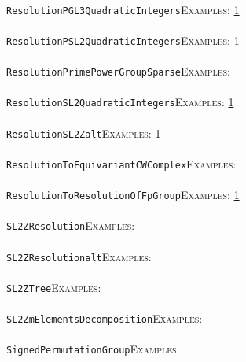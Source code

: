 \documentclass[a4paper,11pt]{report}
\begin{document}
{{ \\
 \texttt{ResolutionPGL3QuadraticIntegers}{\nobreakspace}{\nobreakspace}{\nobreakspace}{\nobreakspace}\textsc{Examples:} \href{tutorial/chap10.html} {1}{\nobreakspace} \\
 \\
 \texttt{ResolutionPSL2QuadraticIntegers}{\nobreakspace}{\nobreakspace}{\nobreakspace}{\nobreakspace}\textsc{Examples:} \href{tutorial/chap10.html} {1}{\nobreakspace} \\
 \\
 \texttt{ResolutionPrimePowerGroupSparse}{\nobreakspace}{\nobreakspace}{\nobreakspace}{\nobreakspace}\textsc{Examples:} \\
 \\
 \texttt{ResolutionSL2QuadraticIntegers}{\nobreakspace}{\nobreakspace}{\nobreakspace}{\nobreakspace}\textsc{Examples:} \href{tutorial/chap10.html} {1}{\nobreakspace} \\
 \\
 \texttt{ResolutionSL2Z{\textunderscore}alt}{\nobreakspace}{\nobreakspace}{\nobreakspace}{\nobreakspace}\textsc{Examples:} \href{tutorial/chap10.html} {1}{\nobreakspace} \\
 \\
 \texttt{ResolutionToEquivariantCWComplex}{\nobreakspace}{\nobreakspace}{\nobreakspace}{\nobreakspace}\textsc{Examples:} \\
 \\
 \texttt{ResolutionToResolutionOfFpGroup}{\nobreakspace}{\nobreakspace}{\nobreakspace}{\nobreakspace}\textsc{Examples:} \href{../www/SideLinks/About/aboutArithmetic.html} {1}{\nobreakspace} \\
 \\
 \texttt{SL2ZResolution}{\nobreakspace}{\nobreakspace}{\nobreakspace}{\nobreakspace}\textsc{Examples:} \\
 \\
 \texttt{SL2ZResolution{\textunderscore}alt}{\nobreakspace}{\nobreakspace}{\nobreakspace}{\nobreakspace}\textsc{Examples:} \\
 \\
 \texttt{SL2ZTree}{\nobreakspace}{\nobreakspace}{\nobreakspace}{\nobreakspace}\textsc{Examples:} \\
 \\
 \texttt{SL2ZmElementsDecomposition}{\nobreakspace}{\nobreakspace}{\nobreakspace}{\nobreakspace}\textsc{Examples:} \\
 \\
 \texttt{SignedPermutationGroup}{\nobreakspace}{\nobreakspace}{\nobreakspace}{\nobreakspace}\textsc{Examples:} \\
}}
\end{document}
